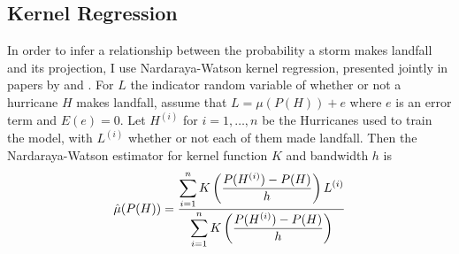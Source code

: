 \subsection{Kernel Regression}
In order to infer a relationship between the probability a storm makes landfall and its projection, I use Nardaraya-Watson kernel regression, presented jointly in papers by \cite{nadaraya1964estimating} and \cite{watson1964smooth}.
For $L$ the indicator random variable of whether or not a hurricane $H$ makes landfall, assume that $L=\mu(P(H))+e$ where $e$ is an error term and $E(e)=0$.
Let $H^{(i)}$ for $i=1,\ldots,n$ be the Hurricanes used to train the model, with $L^{(i)}$ whether or not each of them made landfall.
Then the Nardaraya-Watson estimator for kernel function $K$ and bandwidth $h$ is
\begin{equation}
	\hat\mu(P(H))=\frac{\displaystyle\sum_{i=1}^{n}K\left(\frac{P(H^{(i)})-P(H)}{h}\right)L^{(i)}}{\displaystyle\sum_{i=1}^{n}K\left(\frac{P(H^{(i)})-P(H)}{h}\right)}
	\label{eq:kernel_regression}
\end{equation}